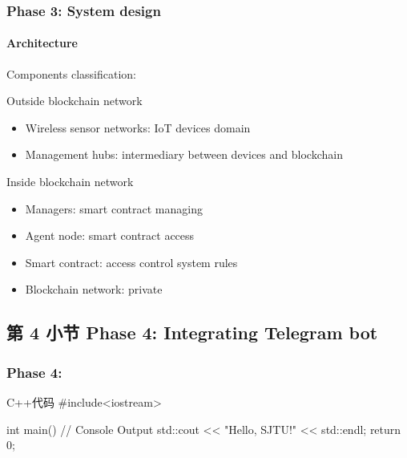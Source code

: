 \documentclass[
    aspectratio=169,                   %
]{beamer}
\begin{document}
    \begin{frame}
        \frametitle{Phase 3: System design}

        \paragraph{Architecture} Components classification:

        \begin{block}{Outside blockchain network}
            \begin{itemize}
                \item \alert{Wireless sensor networks}: IoT devices domain
                \item \alert{Management hubs}: intermediary between devices and blockchain
            \end{itemize}
        \end{block}

        \begin{block}{Inside blockchain network}
            \begin{itemize}
            \item \alert{Managers}: smart contract managing
            \item \alert{Agent node}: smart contract access
            \item \alert{Smart contract}: access control system rules
            \item \alert{Blockchain network}: private
            \end{itemize}
        \end{block}
    \end{frame}

\subsection{第 4 小节 Phase 4: Integrating Telegram bot}

    \begin{frame}[fragile]          %
        \frametitle{Phase 4: }
        \begin{codeblock}[language=c++]{C++代码}
#include<iostream>

int main(){
    // Console Output
    std::cout << "Hello, SJTU!" << std::endl;
    return 0;
}
        \end{codeblock}
    \end{frame}
\end{document}
